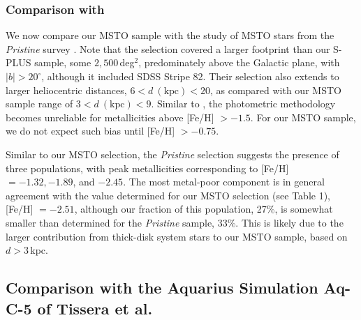 \documentclass[twocolumn,trackchanges]{aastex63}
\begin{document}
\subsubsection{Comparison with \citet{Youakim:2020}}

We now compare our MSTO sample with the \citet{Youakim:2020} study of MSTO stars from the {\it Pristine} survey \citep{Starkenburg:2017}. Note that the \citet{Youakim:2020} selection covered a larger footprint than our S-PLUS sample, some $2,500$\,deg$^2$, predominately above the Galactic plane, with $|b| > 20^{\circ}$, although it included SDSS Stripe 82. Their selection also extends to larger heliocentric distances,  $6 < d~(\textrm{kpc}) < 20$, as compared with our MSTO sample range of $3 < d~(\textrm{kpc}) < 9$. Similar to \cite{An:2015}, the \citet{Youakim:2020} photometric methodology becomes unreliable for metallicities above [Fe/H] $ > -1.5$. For our MSTO sample, we do not expect such bias until [Fe/H] $>-0.75$. %

Similar to our MSTO selection, the \textit{Pristine} selection suggests the presence of three populations, with peak metallicities corresponding to [Fe/H] $=-1.32, -1.89$, and $-2.45$. The most metal-poor component is in general agreement with the value determined for our MSTO selection (see Table 1), [Fe/H] $=-2.51$, although our fraction of this population, 27\%, is somewhat smaller than determined for the \textit{Pristine} sample, 33\%. This is likely due to the larger contribution from thick-disk system stars to our MSTO sample, based on $ d > 3$\,kpc. 

\subsection{Comparison with the Aquarius Simulation Aq-C-5 of Tissera et al.} \label{section:aquarius}
\end{document}
